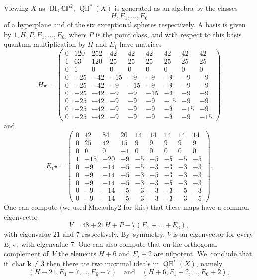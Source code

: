 \documentclass[JEP,XML,SOM,Unicode,NoEqCountersInSection,NoFloatCountersInSection,published]{cedram}
\theoremstyle{definition}
\newcommand{\CC}{\mathbb{C}}
\newcommand{\PP}{\mathbb{P}}
\newcommand{\kk}{{\boldsymbol{k}}}
\newcommand{\Char}{\operatorname{char}}
\newcommand{\QH}{\operatorname{QH}}
\newcommand{\qprod}{\mathbin{\star}}
\begin{document}
Viewing $X$ as $\operatorname{Bl}_6 \CC\PP^2$, $\QH^*(X)$ is generated as an algebra by the classes
\[
H, E_1, \dots, E_6
\]
of a hyperplane and of the six exceptional spheres respectively. A basis is given by $1, H, P, E_1, \dots, E_6$, where $P$ is the point class, and with respect to this basis quantum multiplication by $H$ and $E_1$ have matrices
{\small
\[
H \qprod = \begin{pmatrix} 0 & 120 & 252 & 42 & 42 & 42 & 42 & 42 & 42\\ 1 & 63 & 120 & 25 & 25 & 25 & 25 & 25 & 25\\ 0 & 1 & 0 & 0 & 0 & 0 & 0 & 0 & 0 \\ 0 & -25 & -42 & -15 & -9 & -9 & -9 & -9 & -9\\ 0 & -25 & -42 & -9 & -15 & -9 & -9 & -9 & -9\\ 0 & -25 & -42 & -9 & -9 & -15 & -9 & -9 & -9\\ 0 & -25 & -42 & -9 & -9 & -9 & -15 & -9 & -9\\ 0 & -25 & -42 & -9 & -9 & -9 & -9 & -15 & -9\\ 0 & -25 & -42 & -9 & -9 & -9 & -9 & -9 & -15 \end{pmatrix}
\]
}%
and
{\small
\[
E_1 \qprod = \begin{pmatrix} 0 & 42 & 84 & 20 & 14 & 14 & 14 & 14 & 14\\ 0 & 25 & 42 & 15 & 9 & 9 & 9 & 9 & 9\\ 0 & 0 & 0 & -1 & 0 & 0 & 0 & 0 & 0\\ 1 & -15 & -20 & -9 & -5 & -5 & -5 & -5 & -5\\ 0 & -9 & -14 & -5 & -5 & -3 & -3 & -3 & -3\\ 0 & -9 & -14 & -5 & -3 & -5 & -3 & -3 & -3\\ 0 & -9 & -14 & -5 & -3 & -3 & -5 & -3 & -3\\ 0 & -9 & -14 & -5 & -3 & -3 & -3 & -5 & -3\\ 0 & -9 & -14 & -5 & -3 & -3 & -3 & -3 & -5 \end{pmatrix}.
\]
}%
One can compute (we used Macaulay2 for this) that these maps have a common eigenvector
\[
V = 48+21H+P-7(E_1+\dots+E_6),
\]
with eigenvalue $21$ and $7$ respectively. By~symmetry, $V$ is an eigenvector for every $E_i\qprod$, with eigenvalue $7$. One can also compute that on the orthogonal complement of~$V$ the elements $H+6$ and $E_i+2$ are nilpotent. We~conclude that if $\Char \kk \neq 3$ then there are two maximal ideals in $\QH^*(X)$, namely
\[
(H-21, E_1 - 7, \dots, E_6 - 7) \quad \text{and} \quad (H+6, E_1+2, \dots, E_6+2),
\]
\end{document}

